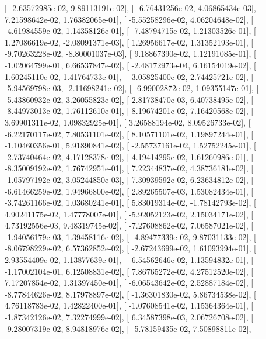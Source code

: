 \documentclass{article}
\begin{document}
       [ -2.63572985e-02,   9.89113191e-02],
       [ -6.76431256e-02,   4.06865434e-03],
       [  7.21598642e-02,   1.76382065e-01],
       [ -5.55258296e-02,   4.06204648e-02],
       [ -4.61984559e-02,   1.14358126e-01],
       [ -7.48794715e-02,   1.21303526e-01],
       [  1.27086619e-02,  -2.08091371e-03],
       [  1.26956617e-02,   1.31352193e-01],
       [ -9.70263228e-02,  -8.80001037e-03],
       [  9.18867390e-02,   1.12191085e-01],
       [ -1.02064799e-01,   6.66537847e-02],
       [ -2.48172973e-04,   6.16154019e-02],
       [  1.60245110e-02,   1.41764733e-01],
       [ -3.05825400e-02,   2.74425721e-02],
       [ -5.94569798e-03,  -2.11698241e-02],
       [ -6.99002872e-02,   1.09355147e-01],
       [ -5.43860932e-02,   3.26055823e-02],
       [  2.81738470e-03,   6.40738495e-02],
       [ -8.44973013e-02,   1.76112610e-01],
       [  8.19674201e-02,   7.16420568e-02],
       [  3.69901311e-02,   1.09832925e-01],
       [  3.26588194e-02,   8.09526733e-02],
       [ -6.22170117e-02,   7.80531101e-02],
       [  8.10571101e-02,   1.19897244e-01],
       [ -1.10460356e-01,   5.91890841e-02],
       [ -2.55737161e-02,   1.52752245e-01],
       [ -2.73740464e-02,   4.17128378e-02],
       [  4.19414295e-02,   1.61260986e-01],
       [ -8.35009192e-02,   1.76742951e-01],
       [  7.22344837e-02,   4.38736181e-02],
       [ -1.05797192e-02,   3.05244850e-03],
       [  7.30939592e-02,   6.23634812e-02],
       [ -6.61466259e-02,   1.94966800e-02],
       [  2.89265507e-03,   1.53082434e-01],
       [ -3.74261166e-02,   1.03680241e-01],
       [  5.83019314e-02,  -1.78142793e-02],
       [  4.90241175e-02,   1.47778007e-01],
       [ -5.92052123e-02,   2.15034171e-02],
       [  4.73192556e-03,   9.48319745e-02],
       [ -7.27608862e-02,   7.06587021e-02],
       [ -1.94056179e-03,   1.39458116e-02],
       [ -4.89477339e-02,   9.87031133e-02],
       [ -8.06798229e-02,   6.57362852e-02],
       [ -2.67243699e-02,   1.61093994e-01],
       [  2.93554409e-02,   1.13877639e-01],
       [ -6.54562646e-02,   1.13594832e-01],
       [ -1.17002104e-01,   6.12508831e-02],
       [  7.86765272e-02,   4.27512520e-02],
       [  7.17207854e-02,   1.31397450e-01],
       [ -6.06543642e-02,   2.52887184e-02],
       [ -8.77844626e-02,   8.17978897e-02],
       [ -1.36301830e-02,   5.86734538e-02],
       [  4.76118783e-02,   1.42822400e-01],
       [ -1.07608541e-02,   1.15364364e-01],
       [ -1.87342126e-02,   7.32274999e-02],
       [  6.34587398e-03,   2.06726708e-02],
       [ -9.28007319e-02,   8.94818976e-02],
       [ -5.78159435e-02,   7.50898811e-02],
\end{document}

